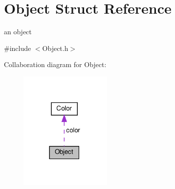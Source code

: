 \hypertarget{struct_object}{}\section{Object Struct Reference}
\label{struct_object}


an object  




{\ttfamily \#include $<$Object.\+h$>$}



Collaboration diagram for Object\+:\nopagebreak
\begin{figure}[H]
\begin{center}
\leavevmode
\includegraphics[width=128pt]{struct_object__coll__graph}
\end{center}
\end{figure}
